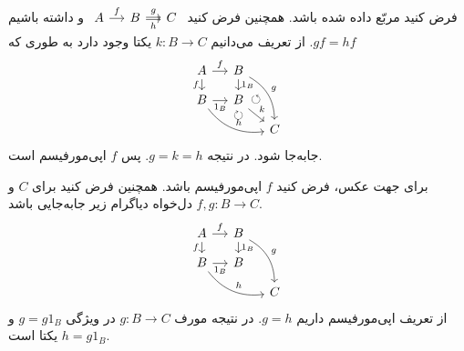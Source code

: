 فرض کنید مربّع داده شده  باشد. همچنین فرض کنید $\begin{tikzcd}[sep=small]
  A \arrow[r, "f"] & B \arrow[r, "g", shift left=.2ex] \arrow[r, "h"', shift right=.2ex] & C
  \end{tikzcd}$ و داشته باشیم $gf = hf$. از تعریف  می‌دانیم $k : B \to C$ یکتا وجود دارد به طوری که
  $$\begin{tikzcd}[sep=small]
    A \arrow[r, "f"] \arrow[d, "f"']               & B \arrow[d, "1_B"] \arrow[rdd, "g", bend left] \arrow[phantom, rdd, "\circlearrowleft "] &   \\
    B \arrow[r, "1_B"'] \arrow[rrd, "h", bend right] \arrow[phantom, rrd, "\circlearrowright "] & B \arrow[rd, "k"]                            &   \\
                                                   &                                              & C
    \end{tikzcd}$$
    جابه‌جا شود. در نتیجه $g = k = h$. پس $f$ اپی‌مورفیسم است.

    برای جهت عکس، فرض کنید $f$ اپی‌مورفیسم باشد. همچنین فرض کنید برای $C$ و $f, g : B \to C$ دل‌خواه دیاگرام زیر جابه‌جایی باشد.
    $$\begin{tikzcd}[sep=small]
      A \arrow[r, "f"] \arrow[d, "f"']               & B \arrow[d, "1_B"] \arrow[rdd, "g", bend left] &   \\
      B \arrow[r, "1_B"'] \arrow[rrd, "h", bend right] & B                            &   \\
                                                     &                                              & C
      \end{tikzcd}$$
      از تعریف اپی‌مورفیسم داریم $g = h$. در نتیجه مورف $g : B \to C$ در ویژگی $g = g 1_B$ و $h = g 1_B$ یکتا است.